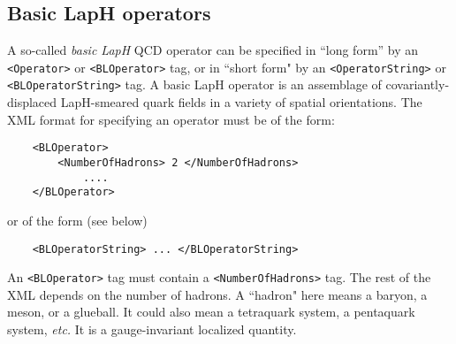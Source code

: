 \documentclass[12pt]{article}
\newcommand{\vb}{\texttt}
\begin{document}
\subsection{Basic LapH operators} 
\label{sec:qcd_op_tag}
A so-called \textit{basic LapH} QCD operator can be specified in ``long form'' 
by an \vb{<Operator>} or \vb{<BLOperator>} tag,
or in ``short form" by an \vb{<OperatorString>} or \vb{<BLOperatorString>} tag.
A basic LapH operator is an assemblage of covariantly-displaced LapH-smeared
quark fields in a variety of spatial orientations.
The XML format for specifying an operator must be of the form:   
\begin{verbatim}                                           
    <BLOperator>                                                
        <NumberOfHadrons> 2 </NumberOfHadrons>                 
            ....                                              
    </BLOperator>                                               
\end{verbatim}                                                              
or of the form (see below)                                    
\begin{verbatim}                                                                                                      
    <BLOperatorString> ... </BLOperatorString>                    
\end{verbatim}                                                              
An \vb{<BLOperator>} tag must contain a \vb{<NumberOfHadrons>} tag.      
The rest of the XML depends on the number of hadrons.         
A ``hadron" here means a baryon, a meson, or a glueball.       
It could also mean a tetraquark system, a pentaquark system,  
\textit{etc.}  It is a gauge-invariant localized quantity.            
\end{document}
